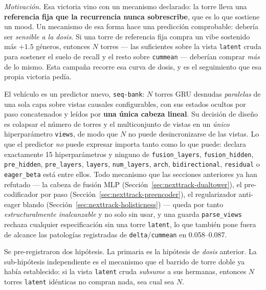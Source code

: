 \documentclass[11pt]{article}
\begin{document}
\emph{Motivación.} Esa victoria vino con un mecanismo declarado: la torre lleva
una \textbf{referencia fija que la recurrencia nunca sobrescribe}, que es lo que
sostiene un mood. Un
mecanismo de esa forma hace una predicción comprobable: debería ser
\emph{sensible a la dosis}. Si una torre de referencia fija compra un vibe
sostenido más $+\num{1.5}$ géneros, entonces $N$ torres --- las suficientes sobre
la vista \texttt{latent} cruda para sostener el suelo de recall y el resto sobre
\texttt{cummean} --- deberían comprar \emph{más} de lo mismo. Esta campaña
recorre esa curva de dosis, y es el seguimiento que esa propia victoria pedía.

El vehículo es un predictor nuevo, \texttt{seq-bank}: $N$ torres GRU desnudas
\emph{paralelas} de una sola capa sobre vistas causales configurables, con sus
estados ocultos por paso concatenados y leídos por \textbf{una única cabeza
lineal}. Su decisión de diseño es colapsar el número de torres y el multiconjunto
de vistas en un \emph{único} hiperparámetro \texttt{views}, de modo que $N$ no
puede desincronizarse de las vistas. Lo que el predictor \emph{no} puede expresar
importa tanto como lo que puede: declara exactamente \num{15} hiperparámetros y
ninguno de \texttt{fusion\_layers}, \texttt{fusion\_hidden},
\texttt{pre\_hidden}, \texttt{pre\_layers}, \texttt{layers},
\texttt{num\_layers}, \texttt{arch}, \texttt{bidirectional}, \texttt{residual} o
\texttt{eager\_beta} está entre ellos. Todo mecanismo que las secciones anteriores ya han
refutado --- la cabeza de fusión MLP (Sección~\ref{sec:nexttrack-dualtower}), el
pre-codificador por paso (Sección~\ref{sec:nexttrack-preencoder}), el regularizador
anti-eager blando (Sección~\ref{sec:nexttrack-holisticness}) --- queda por tanto
\emph{estructuralmente inalcanzable} y no solo sin usar, y una guarda
\texttt{parse\_views} rechaza cualquier especificación sin una torre
\texttt{latent}, lo que también pone fuera de alcance las patologías registradas
de \texttt{delta}/\texttt{cummean} en \numrange{0.058}{0.087}.

Se pre-registraron dos hipótesis. La primaria es la hipótesis de \emph{dosis}
anterior. La sub-hipótesis independiente es el mecanismo que el barrido de torre
doble ya había establecido: si la vista \texttt{latent} cruda \emph{subsume} a sus
hermanas, entonces $N$ torres \texttt{latent} idénticas no compran nada, sea cual
sea $N$.
\end{document}
